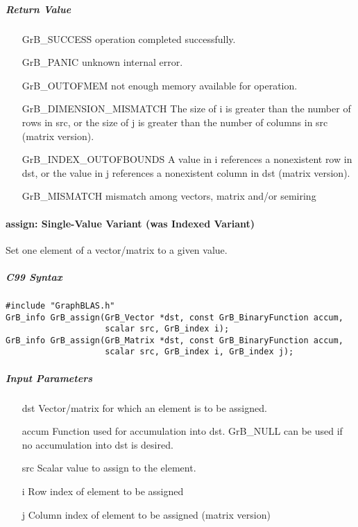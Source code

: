 \subparagraph{Return Value}


\begin{itemize}[leftmargin=2.1in]
\item[{\sf GrB\_SUCCESS}] 	operation completed successfully.
\item[{\sf GrB\_PANIC}]	    unknown internal error.
\item[{\sf GrB\_OUTOFMEM}]	not enough memory available for operation.
\item[{\sf GrB\_DIMENSION\_MISMATCH}] 
        The size of i is greater than the number of rows in src, or
        the size of j is greater than the number of columns in src (matrix version).
\item[{\sf GrB\_INDEX\_OUTOFBOUNDS}]
        A value in i references a nonexistent row in dst, or
	    the value in j references a nonexistent column in dst (matrix version).
\item[\sf GrB\_MISMATCH]  
	   mismatch among vectors, matrix and/or semiring 
\end{itemize}


\paragraph{{\sf assign}: Single-Value Variant (was Indexed Variant)}

Set one element of a vector/matrix to a given value.

\subparagraph{C99 Syntax}

\begin{verbatim}
#include "GraphBLAS.h"
GrB_info GrB_assign(GrB_Vector *dst, const GrB_BinaryFunction accum,
                    scalar src, GrB_index i);
GrB_info GrB_assign(GrB_Matrix *dst, const GrB_BinaryFunction accum,
                    scalar src, GrB_index i, GrB_index j);
\end{verbatim}

\subparagraph{Input Parameters}

\begin{itemize}
	\item[{\sf dst}] Vector/matrix for which an element is to be assigned.
	\item[{\sf accum}] Function used for accumulation into dst.  {\sf GrB\_NULL}
                       can be used if no accumulation into dst is desired.
	\item[{\sf src}] Scalar value to assign to the element.
	\item[{\sf i}]   Row index of element to be assigned
	\item[{\sf j}]   Column index of element to be assigned (matrix version)
\end{itemize}

